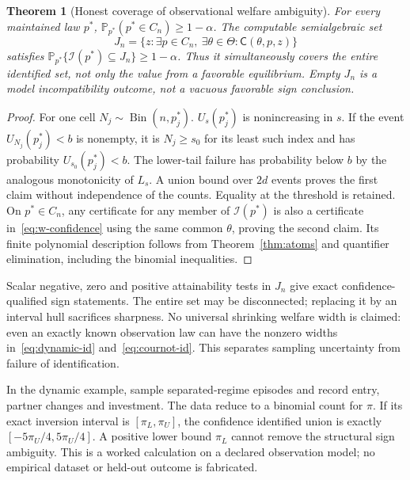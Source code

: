 \documentclass[11pt,a4paper]{article}
\numberwithin{equation}{section}
\newtheorem{theorem}{Theorem}[section]
\theoremstyle{definition}
\newcommand{\Prb}{\mathbb P}
\begin{document}
\begin{theorem}[Honest coverage of observational welfare ambiguity]\label{thm:inference}
For every maintained law $p^*$,
$\Prb_{p^*}(p^*\in C_n)\ge1-\alpha$. The computable semialgebraic set
\begin{equation}\label{eq:w-confidence}
 J_n=\{z:\exists p\in C_n,\ \exists\theta\in\Theta:
                                      \mathsf C(\theta,p,z)\}
\end{equation}
satisfies
$\Prb_{p^*}\{\mathcal I(p^*)\subseteq J_n\}\ge1-\alpha$.
Thus it simultaneously covers the entire identified set, not only
the value from a favorable equilibrium. Empty $J_n$ is a model
incompatibility outcome, not a vacuous favorable sign conclusion.
\end{theorem}
\begin{proof}
For one cell $N_j\sim\operatorname{Bin}(n,p_j^*)$.
$U_s(p_j^*)$ is nonincreasing in $s$. If the event
$U_{N_j}(p_j^*)<b$ is nonempty, it is $N_j\ge s_0$ for its least
such index and has probability $U_{s_0}(p_j^*)<b$.
The lower-tail failure has probability below $b$ by the analogous
monotonicity of $L_s$. A union bound over $2d$ events proves the first
claim without independence of the counts. Equality at the threshold
is retained. On $p^*\in C_n$, any certificate for any member of
$\mathcal I(p^*)$ is also a certificate in~\eqref{eq:w-confidence}
using the same common $\theta$, proving the second claim. Its finite
polynomial description follows from Theorem~\ref{thm:atoms} and
quantifier elimination, including the binomial inequalities.
\end{proof}

Scalar negative, zero and positive attainability tests in $J_n$ give
exact confidence-qualified sign statements. The entire set may be
disconnected; replacing it by an interval hull sacrifices sharpness.
No universal shrinking welfare width is claimed: even an exactly known
observation law can have the nonzero widths in~\eqref{eq:dynamic-id}
and~\eqref{eq:cournot-id}. This separates sampling uncertainty from
failure of identification.

In the dynamic example, sample separated-regime episodes and record
entry, partner changes and investment. The data reduce to a binomial count for
$\pi$. If its exact inversion interval is $[\pi_L,\pi_U]$, the
confidence identified union is exactly
$[-5\pi_U/4,5\pi_U/4]$. A positive lower bound $\pi_L$ cannot remove
the structural sign ambiguity. This is a worked calculation on a
declared observation model; no empirical dataset or held-out outcome
is fabricated.
\end{document}
